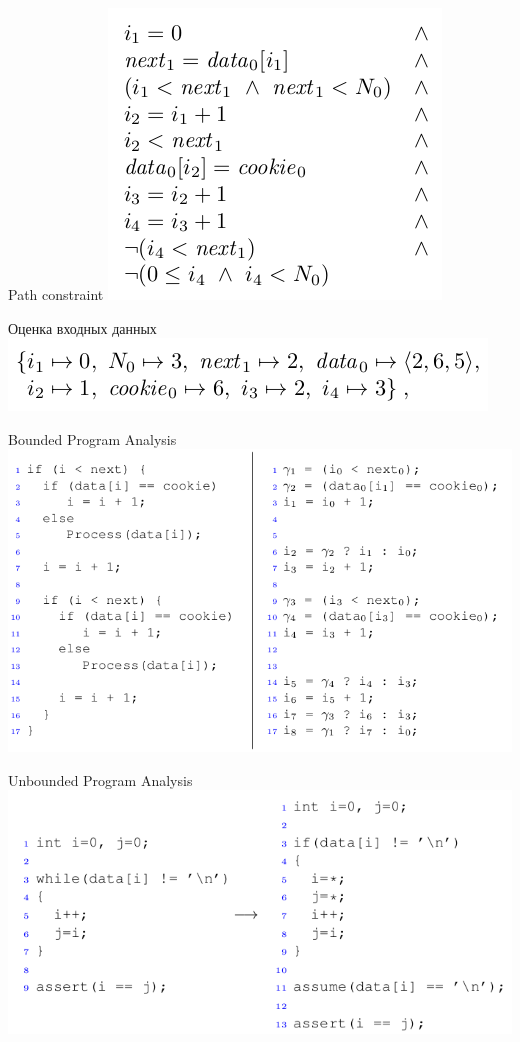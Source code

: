 \documentclass{beamer}
\begin{document}
\begin{frame}{Path constraint}
\includegraphics[scale=0.5]{path_constraint2.png}
\end{frame}

\begin{frame}{Оценка входных данных}
\includegraphics[scale=0.5]{eval.png}
\end{frame}

\begin{frame}{Bounded Program Analysis}
\includegraphics[scale=0.45]{bounded_program_analysis.png}
\end{frame}

\begin{frame}{Unbounded Program Analysis}
\includegraphics[scale=0.5]{unbounded_program_analysis.png}
\end{frame}
\end{document}
